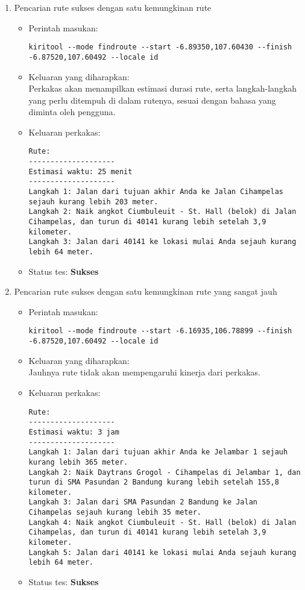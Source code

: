 \begin{enumerate}
	\item Pencarian rute sukses dengan satu kemungkinan rute
	\begin{itemize}
		\item Perintah masukan:
		\begin{lstlisting}
kiritool --mode findroute --start -6.89350,107.60430 --finish -6.87520,107.60492 --locale id
		\end{lstlisting}
		\item Keluaran yang diharapkan: \\
		Perkakas akan menampilkan estimasi durasi rute, serta langkah-langkah yang perlu ditempuh di dalam rutenya, sesuai dengan bahasa yang diminta oleh pengguna.
		\item Keluaran perkakas:
		\begin{lstlisting}
Rute:
--------------------
Estimasi waktu: 25 menit 
--------------------
Langkah 1: Jalan dari tujuan akhir Anda ke Jalan Cihampelas sejauh kurang lebih 203 meter.
Langkah 2: Naik angkot Ciumbuleuit - St. Hall (belok) di Jalan Cihampelas, dan turun di 40141 kurang lebih setelah 3,9 kilometer.
Langkah 3: Jalan dari 40141 ke lokasi mulai Anda sejauh kurang lebih 64 meter.
		\end{lstlisting}
		\item Status tes: \textbf{Sukses}
	\end{itemize}
	
	\item Pencarian rute sukses dengan satu kemungkinan rute yang sangat jauh
	\begin{itemize}
		\item Perintah masukan:
		\begin{lstlisting}
kiritool --mode findroute --start -6.16935,106.78899 --finish -6.87520,107.60492 --locale id
		\end{lstlisting}
		\item Keluaran yang diharapkan: \\
		Jauhnya rute tidak akan mempengaruhi kinerja dari perkakas.
		\item Keluaran perkakas:
		\begin{lstlisting}
Rute:
--------------------
Estimasi waktu: 3 jam 
--------------------
Langkah 1: Jalan dari tujuan akhir Anda ke Jelambar 1 sejauh kurang lebih 365 meter.
Langkah 2: Naik Daytrans Grogol - Cihampelas di Jelambar 1, dan turun di SMA Pasundan 2 Bandung kurang lebih setelah 155,8 kilometer.
Langkah 3: Jalan dari SMA Pasundan 2 Bandung ke Jalan Cihampelas sejauh kurang lebih 35 meter.
Langkah 4: Naik angkot Ciumbuleuit - St. Hall (belok) di Jalan Cihampelas, dan turun di 40141 kurang lebih setelah 3,9 kilometer.
Langkah 5: Jalan dari 40141 ke lokasi mulai Anda sejauh kurang lebih 64 meter.
		\end{lstlisting}
		\item Status tes: \textbf{Sukses}
	\end{itemize}
	

\end{enumerate}
